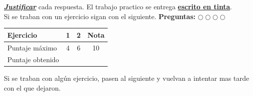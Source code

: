 \documentclass[a4paper,11pt,spanish,sans]{exam}
\begin{document}
	\begin{center}
		\textsl{\textbf{\underline{Justificar}}} cada respuesta. El trabajo practico se entrega \textbf{\underline{escrito en tinta}}.\\
		Si se traban con un ejercicio sigan con el siguiente.
		\textbf{Preguntas:} $\bigcirc \bigcirc \bigcirc  \bigcirc $
	\end{center}
	\begin{table}[h]
		\centering
		\label{my-label}
		\begin{tabular}{|l|c|c|c|}
			\hline
			Ejercicio        & 1 & 2 & Nota \\ \hline
			Puntaje máximo   & 4 & 6 &  10  \\ \hline
			Puntaje obtenido &   &   &      \\ \hline
		\end{tabular}
	\end{table}
	
	Si se traban con algún ejercicio, pasen al siguiente y vuelvan a intentar mas tarde con el que dejaron.
	
\end{document}
